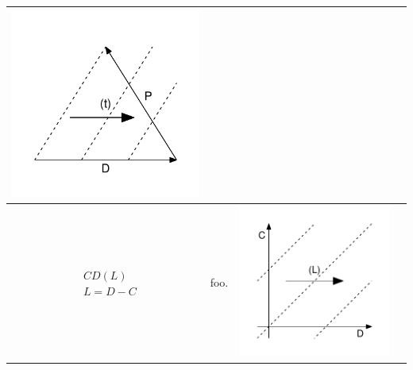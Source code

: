 \documentclass[
  12pt
]{scrartcl}
\begin{document}
\begin{center}
\begin{longtable}{m{}m{}m{}m{}}
  \includegraphics[width = \linewidth]{../fig/PDt_iso.pdf}  \\
  \midrule
  $$\begin{aligned}
    &CD(L) \\
    &L = D - C
  \end{aligned}$$ &
  foo. &
  \includegraphics[width = \linewidth]{../fig/CDl.pdf} &

\end{longtable}
\end{center}
\end{document}
